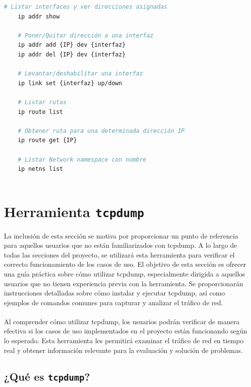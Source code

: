 \begin{lstlisting}[language= bash, style=Consola, caption={Comandos útiles con iproute2},label=code:iproute2_use]
    # Listar interfaces y ver direcciones asignadas
    ip addr show
    
    # Poner/Quitar dirección a una interfaz
    ip addr add {IP} dev {interfaz}
    ip addr del {IP} dev {interfaz}
    
    # Levantar/deshabilitar una interfaz 
    ip link set {interfaz} up/down
    
    # Listar rutas
    ip route list 
    
    # Obtener ruta para una determinada dirección IP
    ip route get {IP}
    
    # Listar Network namespace con nombre
    ip netns list
    

\end{lstlisting}
\newpage

\section{Herramienta \texttt{tcpdump}}
\label{tcpdump}

La inclusión de esta sección se motiva por proporcionar un punto de referencia para aquellos usuarios que no están familiarizados con tcpdump. A lo largo de todas las secciones del proyecto, se utilizará esta herramienta para verificar el correcto funcionamiento de los casos de uso. El objetivo de esta sección es ofrecer una guía práctica sobre cómo utilizar tcpdump, especialmente dirigida a aquellos usuarios que no tienen experiencia previa con la herramienta. Se proporcionarán instrucciones detalladas sobre cómo instalar y ejecutar tcpdump, así como ejemplos de comandos comunes para capturar y analizar el tráfico de red.\\
\\
Al comprender cómo utilizar tcpdump, los usuarios podrán verificar de manera efectiva si los casos de uso implementados en el proyecto están funcionando según lo esperado. Esta herramienta les permitirá examinar el tráfico de red en tiempo real y obtener información relevante para la evaluación y solución de problemas.

\subsection{¿Qué es \texttt{tcpdump}?}

